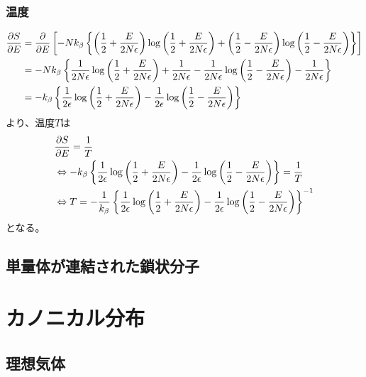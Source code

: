 \documentclass[dvipdfmx, 11pt, a4paper]{jsarticle}
\theoremstyle{definition}
\begin{document}
\subsubsection{温度}
    \begin{align}
        \frac{\partial S}{\partial E} &= \frac{\partial}{\partial E} \left[ -Nk_\beta \left\{ \left( \frac{1}{2} + \frac{E}{2N\epsilon} \right) \log \left( \frac{1}{2} + \frac{E}{2N\epsilon} \right) + \left( \frac{1}{2} - \frac{E}{2N\epsilon} \right) \log \left( \frac{1}{2} - \frac{E}{2N\epsilon} \right) \right\} \right] \notag \\
        &=  -Nk_\beta \left\{ \frac{1}{2N\epsilon} \log \left( \frac{1}{2} + \frac{E}{2N\epsilon} \right) +\frac{1}{2N\epsilon} - \frac{1}{2N\epsilon} \log \left( \frac{1}{2} - \frac{E}{2N\epsilon} \right) -\frac{1}{2N\epsilon} \right\}  \notag \\
        &=  -k_\beta \left\{ \frac{1}{2\epsilon} \log \left( \frac{1}{2} + \frac{E}{2N\epsilon} \right) - \frac{1}{2\epsilon} \log \left( \frac{1}{2} - \frac{E}{2N\epsilon} \right) \right\}  \notag 
    \end{align}
    より、温度$T$は
    \begin{align}
        &\frac{\partial S}{\partial E} = \frac{1}{T} \notag \\
        &\Leftrightarrow -k_\beta \left\{ \frac{1}{2\epsilon} \log \left( \frac{1}{2} + \frac{E}{2N\epsilon} \right) - \frac{1}{2\epsilon} \log \left( \frac{1}{2} - \frac{E}{2N\epsilon} \right) \right\} = \frac{1}{T} \notag \\
        &\Leftrightarrow T = -\frac{1}{k_\beta} \left\{ \frac{1}{2\epsilon} \log \left( \frac{1}{2} + \frac{E}{2N\epsilon} \right) - \frac{1}{2\epsilon} \log \left( \frac{1}{2} - \frac{E}{2N\epsilon} \right) \right\}^{-1}
    \end{align}
    となる。
\subsection{単量体が連結された鎖状分子}
\section{カノニカル分布}
\subsection{理想気体}
\end{document}

